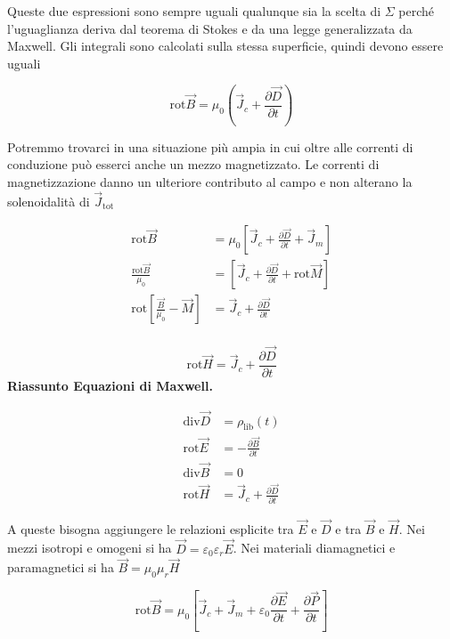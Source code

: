 Queste due espressioni sono sempre uguali qualunque sia la scelta di $\Sigma$ perché l'uguaglianza deriva dal teorema di Stokes e da una legge generalizzata da Maxwell. Gli integrali sono calcolati sulla stessa superficie, quindi devono essere uguali

\[
	\boxed{\text{rot}\vec{B} = \mu_0 \left(\vec{J}_c + \frac{\partial \vec{D}}{\partial t} \right)}
\]

Potremmo trovarci in una situazione più ampia in cui oltre alle correnti di conduzione può esserci anche un mezzo magnetizzato. Le correnti di magnetizzazione danno un ulteriore contributo al campo e non alterano la solenoidalità di $\vec{J}_{\text{tot}} $

\begin{equation*}
	\begin{aligned}
		\text{rot}\vec{B} &= \mu_0 \left[ \vec{J}_c+\frac{\partial \vec{D}}{\partial t} + \vec{J}_m \right] \\
		\frac{\text{rot}\vec{B}}{\mu_0} &= \left[ \vec{J}_c+\frac{\partial \vec{D}}{\partial t} + \text{rot}\vec{M}  \right] \\
		\text{rot} \left[ \frac{\vec{B}}{\mu_0} - \vec{M}  \right] &= \vec{J}_c + \frac{\partial \vec{D}}{\partial t} \\
	\end{aligned}
\end{equation*}

\[
	\boxed{\text{rot}\vec{H} = \vec{J}_c + \frac{\partial \vec{D}}{\partial t}}
\]
\textbf{Riassunto Equazioni di Maxwell.}

\begin{align}
	\text{div}\vec{D} &= \rho_{\text{lib}} (t) \\
	\text{rot}\vec{E} &= -\frac{\partial \vec{B}}{\partial t} \\
	\text{div}\vec{B} &= 0 \\
	\text{rot}\vec{H} &= \vec{J}_c + \frac{\partial \vec{D}}{\partial t}
\end{align}

A queste bisogna aggiungere le relazioni esplicite tra $ \vec{E}  $ e $ \vec{D}  $ e tra $\vec{B}$ e $ \vec{H}  $. Nei mezzi isotropi e omogeni si ha $ \vec{D} = \varepsilon_0 \varepsilon_r \vec{E}  $. Nei materiali diamagnetici e paramagnetici si ha $ \vec{B} = \mu_0 \mu_r \vec{H} $

\[
	\text{rot}\vec{B} = \mu_0 \left[ \vec{J}_c + \vec{J}_m + \varepsilon_0 \frac{\partial \vec{E}}{\partial t} + \frac{\partial \vec{P}}{\partial t} \right]
\]

